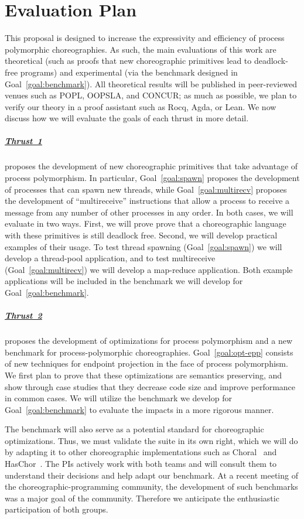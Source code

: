 \section{Evaluation Plan}
\label{sec:eval}

This proposal is designed to increase the expressivity and efficiency of process polymorphic choreographies.
As such, the main evaluations of this work are theoretical (such as proofs that new choreographic primitives lead to deadlock-free programs) and experimental (via the benchmark designed in Goal~\ref{goal:benchmark}).
All theoretical results will be published in peer-reviewed venues such as POPL, OOPSLA, and CONCUR; as much as possible, we plan to verify our theory in a proof assistant such as Rocq, Agda, or Lean.
We now discuss how we will evaluate the goals of each thrust in more detail.

\subparagraph{\hyperref[sec:t1]{Thrust~1}} proposes the development of new choreographic primitives that take advantage of process polymorphism.
In particular, Goal~\ref{goal:spawn} proposes the development of processes that can spawn new threads, while Goal~\ref{goal:multirecv} proposes the development of ``multireceive'' instructions that allow a process to receive a message from any number of other processes in any order.
In both cases, we will evaluate in two ways.
First, we will prove prove that a choreographic language with these primitives is still deadlock free.
Second, we will develop practical examples of their usage.
To test thread spawning (Goal~\ref{goal:spawn}) we will develop a thread-pool application,
and to test multireceive (Goal~\ref{goal:multirecv}) we will develop a map-reduce application.
Both example applications will be included in the benchmark we will develop for Goal~\ref{goal:benchmark}.

\subparagraph{\hyperref[sec:t2]{Thrust~2}} proposes the development of optimizations for process polymorphism and a new benchmark for process-polymorphic choreographies.
Goal~\ref{goal:opt-epp} consists of new techniques for endpoint projection in the face of process polymorphism.
We first plan to prove that these optimizations are semantics preserving,
and show through case studies that they decrease code size and improve performance in common cases.
We will utilize the benchmark we develop for Goal~\ref{goal:benchmark} to evaluate the impacts in a more rigorous manner.

The benchmark will also serve as a potential standard for choreographic optimizations.
Thus, we must validate the suite in its own right,
which we will do by adapting it to other choreographic implementations such as Choral~\cite{GiallorenzoMP24} and HasChor~\cite{ShenKK23,BatesK+25}.
The PIs actively work with both teams and will consult them to understand their decisions and help adapt our benchmark.
At a recent meeting of the choreographic-programming community, the development of such benchmarks was a major goal of the community.
Therefore we anticipate the enthusiastic participation of both groups.

